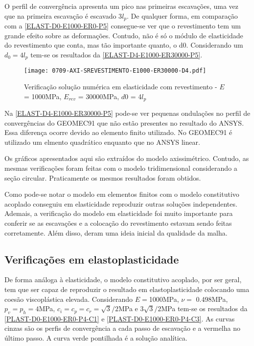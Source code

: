 O perfil de convergência apresenta um pico nas primeiras escavações, uma vez que na primeira escavação é escavado 3$l_p$. De qualquer forma, em comparação com a \autoref{ELAST-D0-E1000-ER0-P5} consegue-se ver que o revestimento tem um grande efeito sobre as deformações. Contudo, não é só o módulo de elasticidade do revestimento que conta, mas tão importante quanto, o d0. Considerando um $d_0=4l_p$ tem-se os resultados da \autoref{ELAST-D4-E1000-ER30000-P5}.

\begin{figure}[H]
	\begin{center}
		\texttt{[image: 0709-AXI-SREVESTIMENTO-E1000-ER30000-D4.pdf]}
	\end{center}
	\caption{\label{ELAST-D4-E1000-ER30000-P5}Verificação solução numérica em elasticidade com revestimento - $E$ = 1000MPa, $E_{rev}$ = 30000MPa, $d0$ = 4$l_p$}
\end{figure}

Na \autoref{ELAST-D4-E1000-ER30000-P5} pode-se ver pequenas ondulações no perfil de convergências do GEOMEC91 que não estão presentes no resultado do ANSYS. Essa diferença ocorre devido ao elemento finito utilizado. No GEOMEC91 é utilizado um elmento quadrático enquanto que no ANSYS linear.

Os gráficos apresentados aqui são extraídos do modelo axissimétrico. Contudo, as mesmas verificações foram feitas com o modelo tridimensional considerando a seção circular. Praticamente os mesmos resultados foram obtidos.

Como pode-se notar o modelo em elementos finitos com o modelo constitutivo acoplado conseguiu em elasticidade reproduzir outras soluções independentes. Ademais, a verificação do modelo em elasticidade foi muito importante para conferir se as escavações e a colocação do revestimento estavam sendo feitas corretamente. Além disso, deram uma ideia inicial da qualidade da malha.

\subsection{Verificações em elastoplasticidade}

De forma análoga à elasticidade, o modelo constitutivo acoplado, por ser geral, tem que ser capaz de reproduzir o resultado em elastoplasticidade colocando uma coesão viscoplástica elevada. Considerando $E =$1000MPa, $\nu =$ 0.498MPa, $p_v = p_h = 4$MPa, $c_i=c_p=c_r = \sqrt{3}/2$MPa e $3\sqrt{3}/2$MPa  tem-se os resultados da \autoref{PLAST-D0-E1000-ER0-P4-C1} e \autoref{PLAST-D0-E1000-ER0-P4-C3}. As curvas cinzas são os perfis de convergência a cada passo de escavação e a vermelha no último passo. A curva verde pontilhada é a solução analítica.

